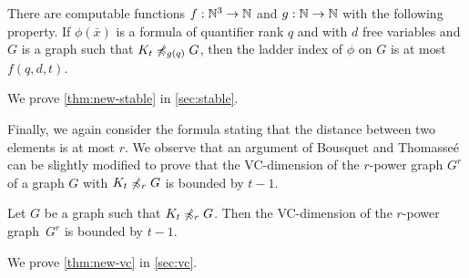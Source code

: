\begin{theorem}\label{thm:new-stable}
  There are computable functions $f:\mathbb{N}^3\to\mathbb{N}$ and $g:\mathbb{N}\to\mathbb{N}$ with the following property.
If $\phi(\bar x)$ is a formula of quantifier rank $q$ and with $d$ free variables
and  $G$ is a graph such that $K_t\not\preccurlyeq_{g(q)} G$, then the ladder index of $\phi$ on $G$ is at most $f(q,d,t)$. 
\end{theorem}

We prove \cref{thm:new-stable} in \cref{sec:stable}. 

\bigskip

Finally, we again consider the formula stating that the distance
between two elements is at most $r$. 
We observe that an argument of Bousquet and 
Thomasse\'e~\cite{BousquetT15} can be slightly modified to prove that 
the VC-dimension of the $r$-power graph $G^r$ of a graph $G$
with $K_t\not\preccurlyeq_r G$ is bounded by $t-1$.

\begin{theorem}\label{thm:new-vc}
Let $G$ be a graph such that $K_t\not\preccurlyeq_r G$. Then the
VC-dimension of the $r$-power graph~$G^r$ is bounded by $t-1$. 
\end{theorem}

We prove \cref{thm:new-vc} in \cref{sec:vc}. 
